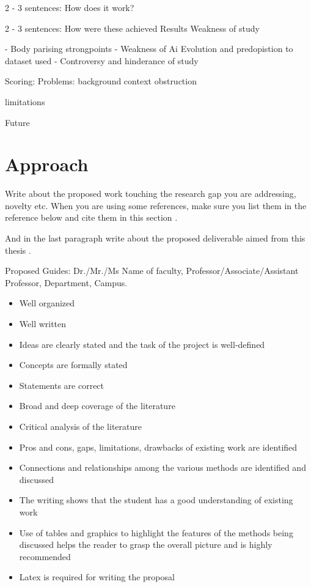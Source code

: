 \documentclass[12pt]{extarticle}
\begin{document}
  2 - 3 sentences: How does it work?

  2 - 3 sentences: How were these achieved
  Results
  Weakness of study

- Body parising strongpoints
- Weakness of Ai Evolution and predopistion to dataset used
- Controversy and hinderance of study


Scoring:
Problems:
 background
 context
 obstruction

limitations

Future


\section{Approach}


Write about the proposed work touching the research gap you are addressing, novelty etc. When you are using some references, make sure you list them in the reference below and cite them in this section \cite{Linhart2014} \cite{Linhart2008}.

And in the last paragraph write about the proposed deliverable aimed from this thesis  \cite{fractalwiki}.

Proposed Guides: Dr./Mr./Ms Name of faculty, Professor/Associate/Assistant Professor, Department, Campus.  \nocite{higham1998handbook}

\begin{itemize}
  \item Well organized
  \item Well written
  \item Ideas are clearly stated and the task of the project is well-defined
  \item Concepts are formally stated
  \item Statements are correct
  \item Broad and deep coverage of the literature
  \item Critical analysis of the literature
  \item Pros and cons, gaps, limitations, drawbacks of existing work are identified
  \item Connections and relationships among the various methods are identified and discussed
  \item The writing shows that the student has a good understanding of existing work
  \item Use of tables and graphics to highlight the features of the methods being discussed helps the reader to grasp the overall picture and is highly recommended
  \item Latex is required for writing the proposal
\end{itemize}




\end{document}
